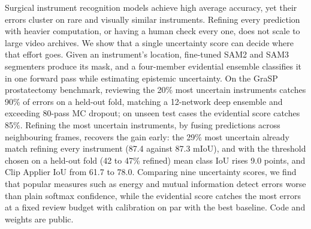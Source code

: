 Surgical instrument recognition models achieve high average accuracy, yet their errors cluster on rare and visually similar instruments.
Refining every prediction with heavier computation, or having a human check every one, does not scale to large video archives.
We show that a single uncertainty score can decide where that effort goes.
Given an instrument's location, fine-tuned SAM2 and SAM3 segmenters produce its mask, and a four-member evidential ensemble classifies it in one forward pass while estimating epistemic uncertainty.
On the GraSP prostatectomy benchmark, reviewing the 20\% most uncertain instruments catches 90\% of errors on a held-out fold, matching a 12-network deep ensemble and exceeding 80-pass MC dropout; on unseen test cases the evidential score catches 85\%.
Refining the most uncertain instruments, by fusing predictions across neighbouring frames, recovers the gain early: the 29\% most uncertain already match refining every instrument (87.4 against 87.3 mIoU), and with the threshold chosen on a held-out fold (42 to 47\% refined) mean class IoU rises 9.0 points, and Clip Applier IoU from 61.7 to 78.0.
Comparing nine uncertainty scores, we find that popular measures such as energy and mutual information detect errors worse than plain softmax confidence, while the evidential score catches the most errors at a fixed review budget with calibration on par with the best baseline.
Code and weights are public.
